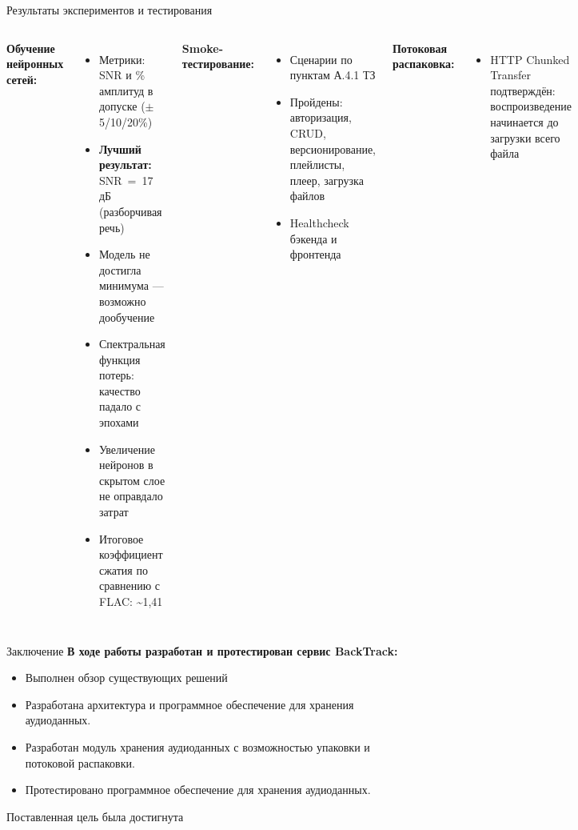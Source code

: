 \documentclass[aspectratio=169,10pt]{beamer}
\begin{document}
\begin{frame}{Результаты экспериментов и тестирования}
  \begin{columns}[t]
      \textbf{Обучение нейронных сетей:}
      \begin{itemize}
        \item Метрики: SNR и \% амплитуд в допуске ($\pm$5/10/20\%)
        \item \textbf{Лучший результат:} SNR~=~17\,дБ (разборчивая речь)
        \item Модель не достигла минимума --- возможно дообучение
        \item Спектральная функция потерь: качество падало с эпохами
        \item Увеличение нейронов в скрытом слое не оправдало затрат
        \item Итоговое коэффициент сжатия по сравнению с FLAC: \textasciitilde1,41
      \end{itemize}
      \textbf{Smoke-тестирование:}
      \begin{itemize}
        \item Сценарии по пунктам А.4.1 ТЗ
        \item Пройдены: авторизация, CRUD, версионирование, плейлисты, плеер, загрузка файлов
        \item Healthcheck бэкенда и фронтенда
      \end{itemize}
      \vspace{0.2em}
      \textbf{Потоковая распаковка:}
      \begin{itemize}
        \item HTTP Chunked Transfer подтверждён: воспроизведение начинается до загрузки всего файла
      \end{itemize}
  \end{columns}
\end{frame}

\begin{frame}{Заключение}
  \textbf{В ходе работы разработан и протестирован сервис BackTrack:}
  \begin{itemize}
    \item Выполнен обзор существующих решений
    \item Разработана архитектура и программное обеспечение для хранения аудиоданных.
    \item Разработан модуль хранения аудиоданных с возможностью упаковки и потоковой распаковки.
    \item Протестировано программное обеспечение для хранения аудиоданных.
  \end{itemize}
  Поставленная цель была достигнута
\end{frame}
\end{document}
